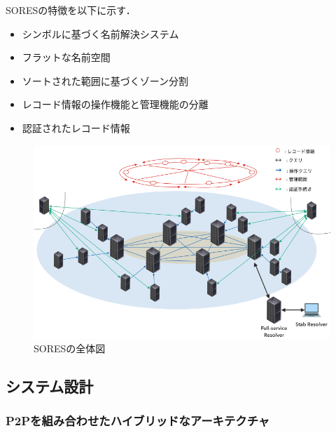 SORESの特徴を以下に示す．
\begin{itemize}
 \item シンボルに基づく名前解決システム
 \vspace{-3mm}
 \item フラットな名前空間
 \vspace{-3mm}
 \item ソートされた範囲に基づくゾーン分割
 \vspace{-3mm}
 \item レコード情報の操作機能と管理機能の分離
 \vspace{-3mm}
 \item 認証されたレコード情報
\end{itemize}

\begin{figure}[t]
 \centering
 \label{fig:abstruct-SORES-architecture}
 \includegraphics[scale=0.5]{figure/abstruct-architecture.png}
 \caption{SORESの全体図}
\end{figure}


\subsection{システム設計}
\subsubsection{P2Pを組み合わせたハイブリッドなアーキテクチャ}

